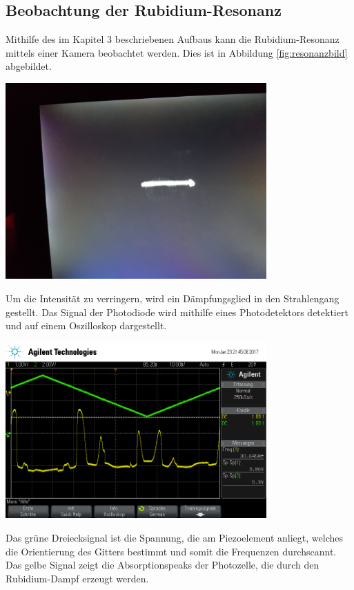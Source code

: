 \documentclass[captions=tableheading]{scrartcl}
\begin{document}
\subsection{Beobachtung der Rubidium-Resonanz}
Mithilfe des im Kapitel 3 beschriebenen Aufbaus kann die Rubidium-Resonanz mittels einer Kamera beobachtet werden. Dies ist in Abbildung \ref{fig:resonanzbild} abgebildet.
\begin{center}
	\includegraphics[width=10cm]{images/resonanz_bild.jpg}
	\label{fig:resonanzbild}
\end{center}
Um die Intensität zu verringern, wird ein Dämpfungsglied in den Strahlengang gestellt. Das Signal der Photodiode wird mithilfe eines Photodetektors detektiert und auf einem Oszilloskop dargestellt. 
\begin{center}
	\includegraphics[width=10cm]{images/scope_22.png}
	\label{fig:resonanz}
\end{center}
Das grüne Dreiecksignal ist die Spannung, die am Piezoelement anliegt, welches die Orientierung des Gitters bestimmt und somit die Frequenzen durchscannt. Das gelbe Signal zeigt die Absorptionspeaks der Photozelle, die durch den Rubidium-Dampf erzeugt werden.
\end{document}
